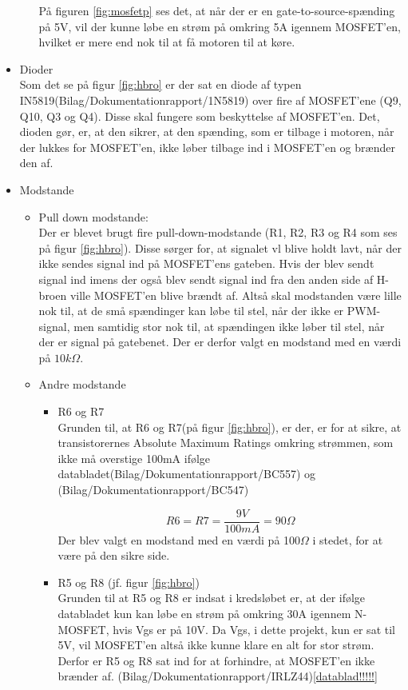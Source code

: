 \begin{itemize}
\begin{itemize}
	På figuren \ref{fig:mosfetp} ses det, at når der er en gate-to-source-spænding på 5V, vil der kunne løbe en strøm på omkring 5A igennem MOSFET'en, hvilket er mere end nok til at få motoren til at køre. 
\end{itemize}

\item Dioder \\
Som det se på figur \ref{fig:hbro} er der sat en diode af typen IN5819(Bilag/Dokumentationrapport/1N5819) over fire af MOSFET'ene (Q9, Q10, Q3 og Q4). Disse skal fungere som beskyttelse af MOSFET'en. Det, dioden gør, er, at den sikrer, at den spænding, som er tilbage i motoren, når der lukkes for MOSFET'en, ikke løber tilbage ind i MOSFET'en og brænder den af.

\item Modstande
\begin{itemize}
	\item Pull down modstande:\\
	Der er blevet brugt fire pull-down-modstande (R1, R2, R3 og R4 som ses på figur \ref{fig:hbro}). Disse sørger for, at signalet vl blive holdt lavt, når der ikke sendes signal ind på MOSFET'ens gateben. Hvis der blev sendt signal ind imens der også blev sendt signal ind fra den anden side af H-broen ville MOSFET'en blive brændt af. Altså skal modstanden være lille nok til, at de små spændinger kan løbe til stel, når der ikke er PWM-signal, men samtidig stor nok til, at spændingen ikke løber til stel, når der er signal på gatebenet. Der er derfor valgt en modstand med en værdi på $10k\Omega$. 
	
	\item Andre modstande
	\begin{itemize}
		\item R6 og R7\\
			Grunden til, at R6 og R7(på figur \ref{fig:hbro}), er der, er for at sikre, at transistorernes Absolute Maximum Ratings omkring strømmen, som ikke må overstige 100mA ifølge databladet(Bilag/Dokumentationrapport/BC557) og (Bilag/Dokumentationrapport/BC547)
		
		\begin{displaymath}
			R6=R7=\frac {9V}{100mA} =90\Omega
		\end{displaymath}
		Der blev valgt en modstand med en værdi på 100$\Omega$ i stedet, for at være på den sikre side. 
		
		\item R5 og R8 (jf. figur \ref{fig:hbro})\\
		Grunden til at R5 og R8 er indsat i kredsløbet er, at der ifølge databladet kun kan løbe en strøm på omkring 30A igennem N-MOSFET, hvis Vgs er på 10V. Da Vgs, i  dette projekt, kun er sat til 5V, vil MOSFET'en altså ikke kunne klare en alt for stor strøm. Derfor er R5 og R8 sat ind for at forhindre, at MOSFET'en ikke brænder af. (Bilag/Dokumentationrapport/IRLZ44)\ref{datablad!!!!!}
		

\end{itemize}
\end{itemize}
\end{itemize}
